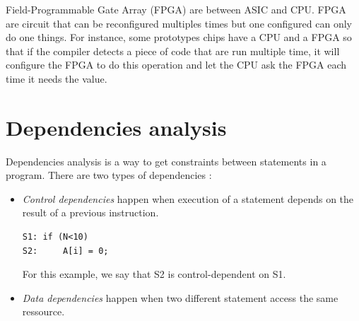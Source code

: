Field-Programmable Gate Array (FPGA) are between ASIC and CPU. FPGA are circuit that can be reconfigured multiples times but one configured can only do one things. For instance, some prototypes chips have a CPU and a FPGA so that if the compiler detects a piece of code that are run multiple time, it will configure the FPGA to do this operation and let the CPU ask the FPGA each time it needs the value.  

\section{Dependencies analysis}
Dependencies analysis is a way to get constraints between statements in a program. There are two types of dependencies :
\begin{itemize}
\item \emph{Control dependencies} happen when execution of a statement depends on the result of a previous instruction. 
\begin{lstlisting}
S1: if (N<10)
S2:     A[i] = 0;
\end{lstlisting}

For this example, we say that S2 is control-dependent on S1.


\item \emph{Data dependencies} happen when two different statement access the same ressource.
\end{itemize}

